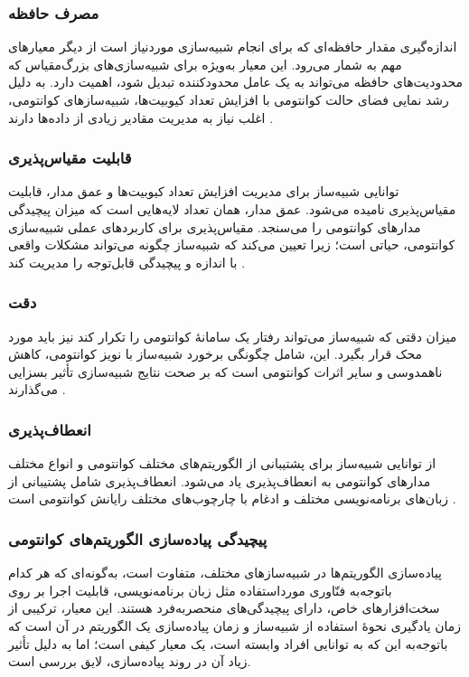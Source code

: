 \subsubsection{مصرف حافظه}
اندازه‌گیری مقدار حافظه‌ای که برای انجام شبیه‌سازی موردنیاز است از دیگر معیارهای مهم به شمار می‌رود. این معیار به‌ویژه برای شبیه‌سازی‌های بزرگ‌مقیاس که محدودیت‌های حافظه می‌تواند به یک عامل محدودکننده تبدیل شود، اهمیت دارد. به دلیل رشد نمایی فضای حالت کوانتومی با افزایش تعداد کیوبیت‌ها، شبیه‌سازهای کوانتومی، اغلب نیاز به مدیریت مقادیر زیادی از داده‌ها دارند \cite{lubinski_application-oriented_2023}.

\subsubsection{قابلیت مقیاس‌پذیری}
توانایی شبیه‌ساز برای مدیریت افزایش تعداد کیوبیت‌ها و عمق مدار، قابلیت مقیاس‌پذیری نامیده می‌شود. عمق مدار، همان تعداد لایه‌هایی است که میزان پیچیدگی مدارهای کوانتومی را می‌سنجد. مقیاس‌پذیری برای کاربردهای عملی شبیه‌سازی کوانتومی، حیاتی است؛ زیرا تعیین می‌کند که شبیه‌ساز چگونه می‌تواند مشکلات واقعی با اندازه و پیچیدگی قابل‌توجه را مدیریت کند \cite{jamadagni_benchmarking_2024, lubinski_application-oriented_2023}.
\subsubsection{دقت}
میزان دقتی که شبیه‌ساز می‌تواند رفتار یک سامانهٔ کوانتومی را تکرار کند نیز باید مورد محک قرار بگیرد. این، شامل چگونگی برخورد شبیه‌ساز با نویز کوانتومی، کاهش ناهمدوسی و سایر اثرات کوانتومی است که بر صحت نتایج شبیه‌سازی تأثیر بسزایی می‌گذارند \cite{jamadagni_benchmarking_2024, lubinski_application-oriented_2023}.
\subsubsection{انعطاف‌پذیری}
از توانایی شبیه‌ساز برای پشتیبانی از الگوریتم‌های مختلف کوانتومی و انواع مختلف مدارهای کوانتومی به انعطاف‌پذیری یاد می‌شود. انعطاف‌پذیری شامل پشتیبانی از زبان‌های برنامه‌نویسی مختلف و ادغام با چارچوب‌های مختلف رایانش کوانتومی است \cite{jamadagni_benchmarking_2024, lubinski_application-oriented_2023, young_simulating_2023}.
\subsubsection{پیچیدگی پیاده‌سازی الگوریتم‌های کوانتومی}
پیاده‌سازی الگوریتم‌ها در شبیه‌سازهای مختلف، متفاوت است، به‌گونه‌ای که هر کدام باتوجه‌به فنّاوری مورداستفاده مثل زبان برنامه‌نویسی، قابلیت اجرا بر روی سخت‌افزارهای خاص، دارای پیچیدگی‌های منحصربه‌فرد هستند. این معیار، ترکیبی از زمان یادگیری نحوهٔ استفاده از شبیه‌ساز و زمان پیاده‌سازی یک الگوریتم در آن است که باتوجه‌به این که به توانایی افراد وابسته است، یک معیار کیفی است؛ اما به دلیل تأثیر زیاد آن در روند پیاده‌سازی، لایق بررسی است.

